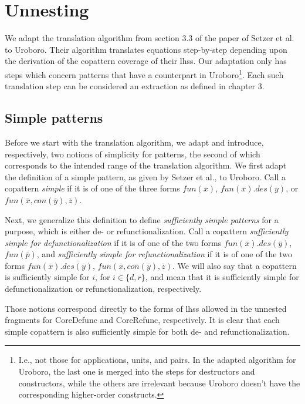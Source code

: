 \section{Unnesting}
\label{sec:unn}

We adapt the translation algorithm from section 3.3 of the paper of Setzer et al. to Uroboro. Their algorithm translates equations step-by-step depending upon the derivation of the copattern coverage of their lhss. Our adaptation only has steps which concern patterns that have a counterpart in Uroboro\footnote{I.e., not those for applications, units, and pairs. In the adapted algorithm for Uroboro, the last one is merged into the steps for destructors and constructors, while the others are irrelevant because Uroboro doesn't have the corresponding higher-order constructs.}. Each such translation step can be considered an extraction as defined in chapter 3.

\subsection{Simple patterns}

Before we start with the translation algorithm, we adapt and introduce, respectively, two notions of simplicity for patterns, the second of which corresponds to the intended range of the translation algorithm. We first adapt the definition of a simple pattern, as given by Setzer et al., to Uroboro. Call a copattern \textit{simple} if it is of one of the three forms $fun(\overline{x})$, $fun(\overline{x}).des(\overline{y})$, or $fun(\overline{x}, con(\overline{y}), \overline{z})$.

Next, we generalize this definition to define \textit{sufficiently simple patterns} for a purpose, which is either de- or refunctionalization. Call a copattern \textit{sufficiently simple for defunctionalization} if it is of one of the two forms $fun(\overline{x}).des(\overline{y})$, $fun(\overline{p})$, and \textit{sufficiently simple for refunctionalization} if it is of one of the two forms $fun(\overline{x}).\overline{des(\overline{y})}$, $fun(\overline{x}, con(\overline{y}), \overline{z})$. We will also say that a copattern is sufficiently simple for $i$, for $i \in \{d,r\}$, and mean that it is sufficiently simple for defunctionalization or refunctionalization, respectively.

Those notions correspond directly to the forms of lhss allowed in the unnested fragments for \textsf{CoreDefunc} and \textsf{CoreRefunc}, respectively. It is clear that each simple copattern is also sufficiently simple for both de- and refunctionalization.

